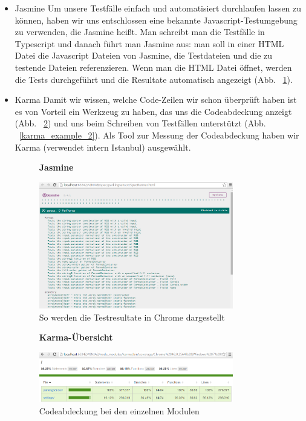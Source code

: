 \documentclass[qualitaetssicherung.tex]{subfiles}
\begin{document}
\begin{itemize}
	
	\item

	Jasmine\newline	
	Um unsere Testfälle einfach und automatisiert durchlaufen lassen zu können, haben wir uns entschlossen eine bekannte Javascript-Testumgebung zu verwenden, die Jasmine heißt. Man schreibt man die Testfälle in Typescript und danach führt man Jasmine aus: man soll in einer HTML Datei die Javascript Dateien von Jasmine, die Testdateien und die zu testende Dateien referenzieren. Wenn man die HTML Datei öffnet, werden die Tests durchgeführt und die Resultate automatisch angezeigt (Abb. ~\ref{jasmine_example}).
	
	\item
	Karma\newline
	Damit wir wissen, welche Code-Zeilen wir schon überprüft haben ist es von Vorteil ein Werkzeug zu haben, das uns die Codeabdeckung anzeigt (Abb. ~\ref{karma_example_1}) und uns beim Schreiben von Testfällen unterstützt (Abb. ~\ref{karma_example_2}). Als Tool zur Messung der Codeabdeckung haben wir Karma (verwendet intern Istanbul) ausgewählt.\newline

	\begin{figure}[H]
		\centering
    \textbf{Jasmine}\par\medskip
    \includegraphics[width=0.8\textwidth]{Images/jasmine-example.png}
    \caption{So werden die Testresultate in Chrome dargestellt}
		\label{jasmine_example}
	\end{figure}
	
	\begin{figure}[H]
		\centering
    \textbf{Karma-Übersicht}\par\medskip
    \includegraphics[width=0.8\textwidth]{Images/karma-example-1.png}
    \caption{Codeabdeckung bei den einzelnen Modulen}
		\label{karma_example_1}
	\end{figure}
	

\end{itemize}
\end{document}
